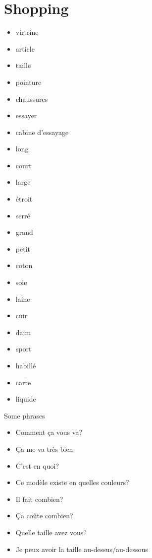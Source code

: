 \documentclass[palatino]{nicenotes}
\begin{document}
\section{Shopping}

\begin{multicols}{3}
\begin{itemize}
\item virtrine
\item article
\item taille
\item pointure
\item chaussures
\item essayer
\item cabine d'essayage
\item long
\item court
\item large
\item étroit
\item serré
\item grand
\item petit
\item coton
\item soie
\item laine
\item cuir
\item daim
\item sport
\item habillé
\item carte
\item liquide
\end{itemize}
\end{multicols}

Some phrases

\begin{multicols}{2}
\begin{itemize}
\item Comment ça vous va?
\item Ça me va très bien
\item C'est en quoi?
\item Ce modèle existe en quelles couleurs?
\item Il fait combien?
\item Ça co\^ute combien?
\item Quelle taille avez vous?
\item Je peux avoir la taille au-dessus/au-dessous
\end{itemize}
\end{multicols}
\end{document}
